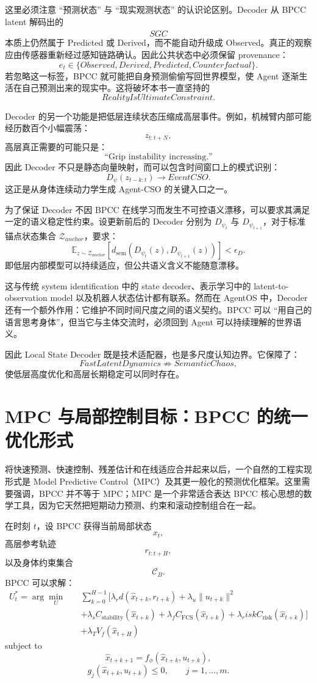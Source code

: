 这里必须注意 ``预测状态'' 与 ``现实观测状态'' 的认识论区别。Decoder 从 BPCC latent 解码出的
\[
\hat{SGC}
\]
本质上仍然属于 Predicted 或 Derived，而不能自动升级成 Observed。真正的观察应由传感器重新经过感知链路确认。因此公共状态中必须保留 provenance：
\[
e_t
\in
\{
Observed,
Derived,
Predicted,
Counterfactual
\}.
\]
若忽略这一标签，BPCC 就可能把自身预测偷偷写回世界模型，使 Agent 逐渐生活在自己预测出来的现实中。这将破坏本书一直坚持的
\[
RealityIsUltimateConstraint.
\]

Decoder 的另一个功能是把低层连续状态压缩成高层事件。例如，机械臂内部可能经历数百个小幅震荡：
\[
z_{t:t+N},
\]
高层真正需要的可能只是：
\[
\text{``Grip instability increasing.''}
\]
因此 Decoder 不只是静态向量映射，而可以包含时间窗口上的模式识别：
\[
D_\psi
\left(
z_{t-k:t}
\right)
\rightarrow
EventCSO.
\]
这正是从身体连续动力学生成 Agent-CSO 的关键入口之一。

为了保证 Decoder 不因 BPCC 在线学习而发生不可控语义漂移，可以要求其满足一定的语义稳定性约束。设更新前后的 Decoder 分别为 $D_{\psi_t}$ 与 $D_{\psi_{t+1}}$，对于标准锚点状态集合 $\mathcal Z_{anchor}$，要求：
\[
\mathbb E_{z\sim\mathcal Z_{anchor}}
\left[
d_{\mathrm{sem}}
\left(
D_{\psi_t}(z),
D_{\psi_{t+1}}(z)
\right)
\right]
<
\epsilon_D.
\]
即低层内部模型可以持续适应，但公共语义含义不能随意漂移。

这与传统 system identification 中的 state decoder、表示学习中的 latent-to-observation model 以及机器人状态估计都有联系。然而在 AgentOS 中，Decoder 还有一个额外作用：它维护不同时间尺度之间的语义契约。BPCC 可以 ``用自己的语言思考身体''，但当它与主体交流时，必须回到 Agent 可以持续理解的世界语义。

因此 Local State Decoder 既是技术适配器，也是多尺度认知边界。它保障了：
\[
FastLatentDynamics
\not\Rightarrow
SemanticChaos,
\]
使低层高度优化和高层长期稳定可以同时存在。

\section{MPC 与局部控制目标：BPCC 的统一优化形式}

将快速预测、快速控制、残差估计和在线适应合并起来以后，一个自然的工程实现形式是 Model Predictive Control（MPC）及其更一般化的预测优化框架。这里需要强调，BPCC 并不等于 MPC；MPC 是一个非常适合表达 BPCC 核心思想的数学工具，因为它天然把短期动力预测、约束和滚动控制组合在一起。

在时刻 $t$，设 BPCC 获得当前局部状态
\[
x_t,
\]
高层参考轨迹
\[
r_{t:t+H},
\]
以及身体约束集合
\[
\mathcal C_B.
\]
BPCC 可以求解：
\[
\begin{aligned}
U_t^\ast
=
\arg\min_{U}
\quad&
\sum_{k=0}^{H-1}
\Big[
\lambda_r
d(\hat x_{t+k},r_{t+k})
+
\lambda_u
\|u_{t+k}\|^2
\\
&+
\lambda_s
C_{\mathrm{stability}}
(\hat x_{t+k})
+
\lambda_f
C_{\mathrm{FCS}}
(\hat x_{t+k})
+
\lambda_risk
C_{\mathrm{risk}}
(\hat x_{t+k})
\Big]
\\
&+
\lambda_T
V_f(\hat x_{t+H})
\end{aligned}
\]
subject to
\[
\hat x_{t+k+1}
=
f_\phi(
\hat x_{t+k},
u_{t+k}
),
\]
\[
g_j(
\hat x_{t+k},
u_{t+k}
)
\leq0,
\qquad
j=1,\ldots,m.
\]

